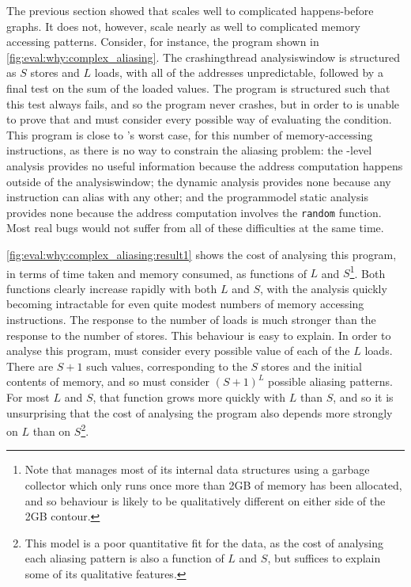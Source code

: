 The previous section showed that {\technique} scales well to
complicated happens-before graphs.  It does not, however, scale nearly
as well to complicated memory accessing patterns.  Consider, for
instance, the program shown in
\autoref{fig:eval:why:complex_aliasing}.  The \gls{crashingthread}
\gls{analysiswindow} is structured as $S$ stores and $L$ loads, with
all of the addresses unpredictable, followed by a final test on the
sum of the loaded values.  The program is structured such that this
test always fails, and so the program never crashes, but in order to
{\technique} is unable to prove that and must consider every possible
way of evaluating the condition.  This program is close to
{\technique}'s worst case, for this number of memory-accessing
instructions, as there is no way to constrain the aliasing problem:
the {\StateMachine}-level analysis provides no useful information
because the address computation happens outside of the
\gls{analysiswindow}; the dynamic analysis provides none because any
instruction can alias with any other; and the \gls{programmodel}
static analysis provides none because the address computation involves
the \texttt{random} function.  Most real bugs would not suffer from
all of these difficulties at the same time.

\autoref{fig:eval:why:complex_aliasing:result1} shows the cost of
analysing this program, in terms of time taken and memory consumed, as
functions of $L$ and $S$\footnote{Note that {\implementation} manages
  most of its internal data structures using a garbage collector which
  only runs once more than 2GB of memory has been allocated, and so
  behaviour is likely to be qualitatively different on either side of
  the 2GB contour.}.  Both functions clearly increase rapidly with
both $L$ and $S$, with the analysis quickly becoming intractable for
even quite modest numbers of memory accessing instructions.  The
response to the number of loads is much stronger than the response to
the number of stores.  This behaviour is easy to explain.  In order to
analyse this program, {\technique} must consider every possible value
of each of the $L$ loads.  There are $S+1$ such values, corresponding
to the $S$ stores and the initial contents of memory, and so
{\technique} must consider $(S+1)^L$ possible aliasing patterns.  For
most $L$ and $S$, that function grows more quickly with $L$ than $S$,
and so it is unsurprising that the cost of analysing the program also
depends more strongly on $L$ than on $S$\footnote{This model is a poor
  quantitative fit for the data, as the cost of analysing each
  aliasing pattern is also a function of $L$ and $S$, but suffices to
  explain some of its qualitative features.}.

